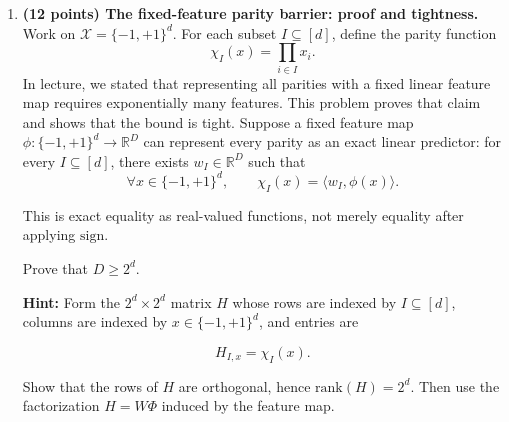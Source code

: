 \documentclass[11pt]{article}
\begin{document}
\begin{enumerate}
\begin{solutionbox}
    This shows that minimizing a convex surrogate can select a classifier whose 0-1 risk is
    arbitrarily bad compared to the best 0-1 classifier.

    \medskip

    \textbf{Intuition.}

    The majority point is $(1,+1)$, with probability $1-p$. The best 0-1 classifier chooses
    $w>0$ and gets this majority point correct, making only the rare point $(-M,+1)$ wrong.

    However, the hinge loss cares not only about correctness but also about margin size. The rare
    point has input value $-M$, so if $M$ is very large, choosing $w>0$ creates a very large hinge
    penalty on the rare point. The hinge objective therefore prefers a negative weight
    $w^\ast=-1/M$, which correctly handles the rare high-magnitude point but misclassifies the
    majority point. This is why the surrogate minimizer can be bad for 0-1 classification.

    \end{solutionbox}

    \item \textbf{(12 points) The fixed-feature parity barrier: proof and tightness.}
    Work on $\mathcal{X} = \{-1,+1\}^d$. For each subset $I \subseteq [d]$, define the parity function
    \[
    \chi_I(x) = \prod_{i \in I} x_i.
    \]
    In lecture, we stated that representing all parities with a fixed linear feature map requires 
    exponentially many features. This problem proves that claim and shows that the bound 
    is tight.
    Suppose a fixed feature map $\phi : \{-1,+1\}^d \to \mathbb{R}^D$ can represent every parity as an exact 
    linear predictor: for every $I \subseteq [d]$, there exists $w_I \in \mathbb{R}^D$ such that
    \[
    \forall x \in \{-1,+1\}^d,\qquad \chi_I(x) = \langle w_I, \phi(x) \rangle.
    \]
    
    
    This is exact equality as real-valued functions, not merely equality after applying $\mathrm{sign}$.
    
    Prove that $D \ge 2^d$.
    
    \medskip
    \noindent\textbf{Hint:} Form the $2^d \times 2^d$ matrix $H$ whose rows are indexed by $I \subseteq [d]$, 
    columns are indexed by $x \in \{-1,+1\}^d$, and entries are
    
    
    \[
    H_{I,x} = \chi_I(x).
    \]
    
    
    Show that the rows of $H$ are orthogonal, hence $\mathrm{rank}(H) = 2^d$. Then use the factorization 
    $H = W \Phi$ induced by the feature map.
    

\end{enumerate}
\end{document}
